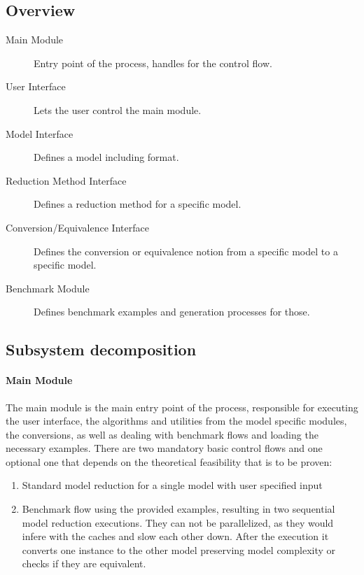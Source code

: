 		\subsection{Overview}
			\begin{description}
				\item[Main Module] Entry point of the process, handles for the control flow.
				\item[User Interface] Lets the user control the main module.
				\item[Model Interface] Defines a model including format.
				\item[Reduction Method Interface] Defines a reduction method for a specific model.
				\item[Conversion/Equivalence Interface] Defines the conversion or equivalence notion from a specific model to a specific model.
				\item[Benchmark Module] Defines benchmark examples and generation processes for those.
			\end{description}
			
			
		\subsection{Subsystem decomposition}
			\paragraph{Main Module}
                The main module is the main entry point of the process, responsible for executing the user interface, the algorithms and utilities from the model specific modules, the conversions, as well as dealing with benchmark flows and loading the necessary examples. There are two mandatory basic control flows and one optional one that depends on the theoretical feasibility that is to be proven: 
                \begin{enumerate}
                    \item Standard model reduction for a single model with user specified input
                    \item Benchmark flow using the provided examples, resulting in two sequential model reduction executions. They can not be parallelized, as they would infere with the caches and slow each other down. After the execution it converts one instance to the other model preserving model complexity or checks if they are equivalent.
                \end{enumerate}


